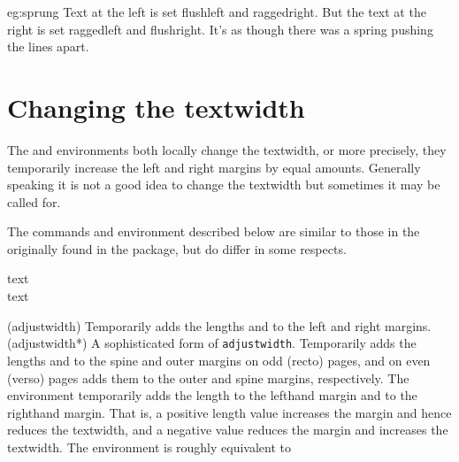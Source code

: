 \begin{egsource}{eg:sprung}
%
  {Text at the left is set flushleft and raggedright.}
  {But the text at the right is set raggedleft and flushright.
   It's as though there was a spring pushing the lines apart.}
\end{egsource}

\section{Changing the textwidth}\label{sec:adjustwidth}

    The  and  environments both locally change the 
textwidth, or more precisely, they temporarily increase the left and right 
margins by equal amounts. 
Generally speaking it is not a 
good idea to change the textwidth but sometimes it may be called for.

The commands and environment described below are similar to those in
the originally found in the  package, but do differ in
some respects.

\begin{syntax}
 text  \\
 text  \\
\end{syntax}
\glossary(adjustwidth)%
  {}%
  {Temporarily adds the lengths  and  to the left
   and right margins.}
\glossary(adjustwidth*)%
  {}%
  {A sophisticated form of \texttt{adjustwidth}. 
   Temporarily adds the lengths  and  to the spine
   and outer margins on odd (recto) pages, and on even (verso) pages adds
   them to the outer and spine margins, respectively.}
The  environment temporarily adds the length 
to the lefthand margin and  to the righthand 
margin. That is, a positive length value increases the 
margin and hence reduces the textwidth,
and a negative value reduces the margin and increases the 
textwidth. The  environment is roughly equivalent to
\begin{lcode}
\begin{adjustwidth}{2.5em}{2.5em}
\end{lcode}

